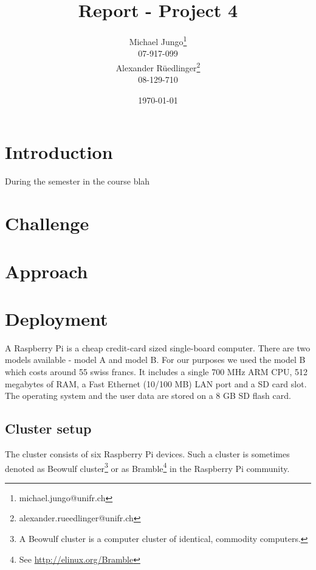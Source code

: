 \documentclass[10pt,a4paper]{article}
\begin{document}
\onehalfspacing 
\begin{titlepage}
\author{Michael Jungo\footnote{michael.jungo@unifr.ch} \\ 07-917-099 \\ Alexander Rüedlinger\footnote{alexander.rueedlinger@unifr.ch} \\ 08-129-710\\ }
\title{Report - Project 4 \\ \vspace{0.5em} }

\date{\today}
\maketitle
\end{titlepage}

\tableofcontents
{} %
\newpage
{} %
\section{Introduction}
During the semester in the course blah 


\section{Challenge}
\section{Approach}


\section{Deployment}
A Raspberry Pi is a cheap credit-card sized single-board computer. There are two models available - model A and model B. For our purposes we used the model B which costs around 55 swiss francs. It includes a single 700 MHz ARM CPU, 512 megabytes of RAM, a Fast Ethernet (10/100 MB) LAN port and a SD card slot. The operating system and the user data are stored on a 8 GB SD flash card. 

\subsection{Cluster setup}
The cluster consists of six Raspberry Pi devices. Such a cluster is sometimes denoted as Beowulf cluster\footnote{A Beowulf cluster is a computer cluster of identical, commodity computers.} or as Bramble\footnote{See \url{http://elinux.org/Bramble}} in the Raspberry Pi community.
\end{document}
